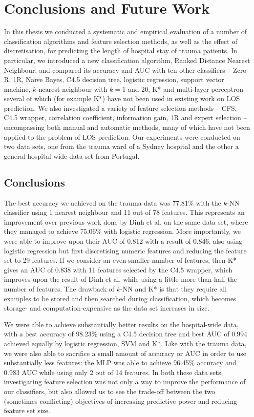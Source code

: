 \chapter{Conclusions and Future Work} \label{chap:conclusion}

In this thesis we conducted a systematic and empirical evaluation of a number
of classification algorithms and feature selection methods, as well as the
effect of discretisation, for predicting the length of hospital stay of trauma
patients. In particular, we introduced a new classification algorithm, Ranked
Distance Nearest Neighbour, and compared its accuracy and AUC with ten
other classifiers -- Zero-R, 1R, Na\"{i}ve Bayes, C4.5 decision tree, logistic
regression, support vector machine, $k$-nearest neighbour with $k=1$ and 20,
K* and multi-layer perceptron -- several of which (for example K*) have not
been used in existing work on LOS prediction. We also investigated a variety of
feature selection methods -- CFS, C4.5 wrapper, correlation coefficient,
information gain, 1R and expert selection -- encompassing both manual and
automatic methods, many of which have not been applied to the problem of LOS
prediction. Our experiments were conducted on two data sets, one from the
trauma ward of a Sydney hospital and the other a general hospital-wide data
set from Portugal.

\section{Conclusions}
The best accuracy we achieved on the trauma data was 77.81\% with the $k$-NN
classifier using 1 nearest neighbour and 11 out of 78 features. This represents
an improvement over previous work done by Dinh et al. \cite{Dinh2013a}
on the same data set,
where they managed to achieve 75.06\% with logistic regression. More
importantly, we were able to improve upon their AUC of 0.812 with a result of
0.846, also using logistic regression but first discretising numeric features
and reducing the feature set to 29 features.
If we consider an even smaller number of features, then K*
gives an AUC of 0.838 with 11 features selected by the C4.5 wrapper, which
improves upon the result of Dinh et al. \cite{Dinh2013a} while using a little
more than half
the number of features. The drawback of $k$-NN and K* is that they require all
examples to be stored and then searched during classification, which becomes
storage- and computation-expensive as the data set increases in size.

We were able to achieve substantially better results on the hospital-wide data,
with a best accuracy of 98.23\% using a C4.5 decision tree and best AUC of
0.994 achieved equally by logistic regression, SVM and K*. Like with the
trauma data, we were also able to sacrifice a small amount of accuracy or AUC
in order to use substantially less features: the MLP was able to achieve
96.45\% accuracy and 0.983 AUC while using only 2 out of 14 features. In both
these data sets, investigating feature selection was not only a way to
improve the performance of our classifiers, but also allowed us to see the
trade-off between the two (sometimes conflicting) objectives of increasing
predictive power and reducing feature set size.

